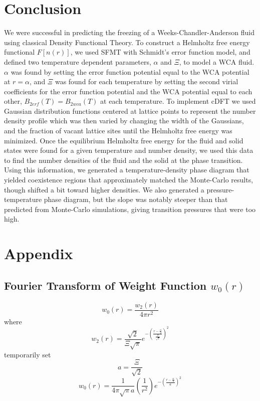 \documentclass[double,12pt]{beavtex}
\begin{document}
\chapter{Conclusion}
We were successful in predicting the freezing of a Weeks-Chandler-Anderson 
fluid using classical Density Functional Theory. To construct a Helmholtz 
free energy functional $F[n(r)]$, we used SFMT with Schmidt's error 
function model, and defined two temperature dependent parameters, $\alpha$ 
and $\Xi$, to model a WCA fluid. 
$\alpha$ was found by setting the error function potential equal to the 
WCA potential at $r=\alpha$, and $\Xi$ was found for each temperature by 
setting the second virial coefficients for the error function potential 
and the WCA potential equal to each other, $B_{2erf}(T)=B_{2wca}(T)$ 
at each temperature.
To implement cDFT we used Gaussian distribution functions centered at 
lattice points to represent the number density profile which was then varied
by changing the width of the Gaussians, and the fraction of vacant lattice
sites until the Helmholtz free energy was minimized. Once the equilibrium 
Helmholtz free energy for the fluid and solid states were found for a given
temperature and number density, 
we used this data 
to find the number densities of the fluid and the solid at the phase transition.
Using this information, we generated a temperature-density 
phase diagram that yielded coexistence regions that approximately 
matched the Monte-Carlo
results, though shifted a bit toward higher densities. 
We also generated a pressure-temperature
phase diagram, but the slope was notably steeper than that
predicted from Monte-Carlo simulations, giving transition 
pressures that were too high. 



\backmatter

\chapter{Appendix}

\section{Fourier Transform of Weight Function $w_0(r)$}
\begin{equation}{w_0(r)=\frac{w_2(r)}{4{\pi}r^2}}\end{equation}
where
\begin{equation}{w_2(r)=\frac{\sqrt{2}}{\Xi\sqrt{\pi}}e^{-\left(\frac{r-\frac{\alpha}{2}}{\frac{\Xi}{\sqrt{2}}}\right)^2}}\end{equation}
temporarily set 
\begin{equation}{a=\frac{\Xi}{\sqrt{2}}}\end{equation}
\begin{equation}{w_0(r)=\frac{1}{4{\pi}\sqrt{\pi}a}\left(\frac{1}{r^2}\right)e^{-\left(\frac{r-\frac{\alpha}{2}}{a}\right)^2}}\end{equation}
\end{document}
